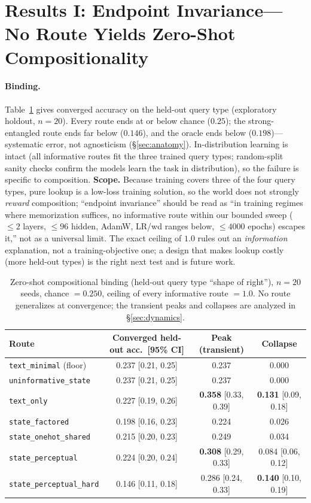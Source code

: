 \documentclass[10pt]{article} %
\begin{document}
\section{Results I: Endpoint Invariance---No Route Yields Zero-Shot Compositionality}
\label{sec:endpoint}
\paragraph{Binding.} Table~\ref{tab:zeroshot} gives converged accuracy on the held-out query type
(exploratory holdout, $n{=}20$). Every route ends at or below chance ($0.25$); the strong-entangled
route ends far below ($0.146$), and the oracle ends below ($0.198$)---systematic error, not
agnosticism (\S\ref{sec:anatomy}). In-distribution learning is intact (all informative routes fit
the three trained query types; random-split sanity checks confirm the models learn the task in
distribution), so the failure is specific to composition. \textbf{Scope.} Because training
covers three of the four query types, pure lookup is a low-loss training solution, so the world
does not strongly \emph{reward} composition; ``endpoint invariance'' should be read as ``in
training regimes where memorization suffices, no informative route within our bounded sweep (${\le}2$ layers,
${\le}96$ hidden, AdamW, LR/wd ranges below, ${\le}4000$ epochs) escapes it,'' not as a universal
limit. The exact ceiling of $1.0$ rules out an \emph{information} explanation, not a
training-objective one; a design that makes lookup costly (more held-out types) is the right next
test and is future work.

\begin{table}[h]
\centering\small
\begin{tabular}{lccc}
\toprule
Route & Converged held-out acc.\ [95\% CI] & Peak (transient) & Collapse\\
\midrule
\texttt{text\_minimal} (floor) & 0.237 [0.21, 0.25] & 0.237 & 0.000\\
\texttt{uninformative\_state} & 0.237 [0.21, 0.25] & 0.237 & 0.000\\
\texttt{text\_only} & 0.227 [0.19, 0.26] & \textbf{0.358} [0.33, 0.39] & \textbf{0.131} [0.09, 0.18]\\
\texttt{state\_factored} & 0.198 [0.16, 0.23] & 0.224 & 0.026\\
\texttt{state\_onehot\_shared} & 0.215 [0.20, 0.23] & 0.249 & 0.034\\
\texttt{state\_perceptual} & 0.224 [0.20, 0.24] & \textbf{0.308} [0.29, 0.33] & 0.084 [0.06, 0.12]\\
\texttt{state\_perceptual\_hard} & 0.146 [0.11, 0.18] & 0.286 [0.24, 0.33] & \textbf{0.140} [0.10, 0.19]\\
\bottomrule
\end{tabular}
\caption{Zero-shot compositional binding (held-out query type ``shape of right''), $n{=}20$ seeds,
chance $= 0.250$, ceiling of every informative route $= 1.0$. No route generalizes at convergence;
the transient peaks and collapses are analyzed in \S\ref{sec:dynamics}.}
\label{tab:zeroshot}
\end{table}
\end{document}
